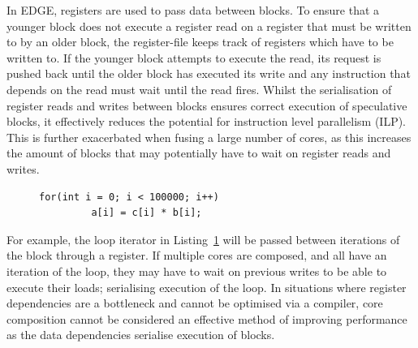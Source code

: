 In EDGE, registers are used to pass data between blocks.
To ensure that a younger block does not execute a register read on a register that must be written to by an older block, the register-file keeps track of registers which have to be written to.
If the younger block attempts to execute the read, its request is pushed back until the older block has executed its write and any instruction that depends on the read must wait until the read fires.
Whilst the serialisation of register reads and writes between blocks ensures correct execution of speculative blocks, it effectively reduces the potential for instruction level parallelism (ILP).
This is further exacerbated when fusing a large number of cores, as this increases the amount of blocks that may potentially have to wait on register reads and writes.


\begin{figure}[t]
\lstset{language=C,numbersep=4pt}
\begin{center}
\begin{lstlisting}
for(int i = 0; i < 100000; i++)
         a[i] = c[i] * b[i];
\end{lstlisting}
\end{center}
\vspace{-1em}
\label{lst:chp3:small}
\vspace{1em}
\end{figure}

For example, the loop iterator in Listing~\ref{lst:chp3:small} will be passed between iterations of the block through a register.
If multiple cores are composed, and all have an iteration of the loop, they may have to wait on previous writes to be able to execute their loads; serialising execution of the loop.
In situations where register dependencies are a bottleneck and cannot be optimised via a compiler, core composition cannot be considered an effective method of improving performance as the data dependencies serialise execution of blocks.

